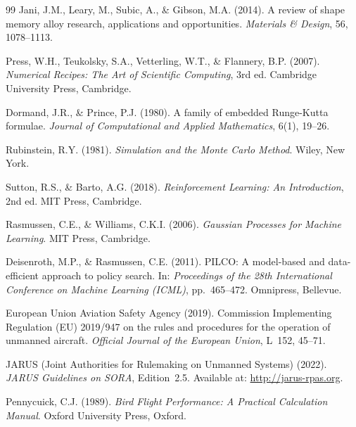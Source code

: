 ﻿\documentclass[12pt,a4paper]{article}
\theoremstyle{remark}
\begin{document}
\begin{thebibliography}{99}
		Jani, J.M., Leary, M., Subic, A., \& Gibson, M.A. (2014). A review of shape memory alloy research, applications and opportunities. \textit{Materials \& Design}, 56, 1078--1113.


		Press, W.H., Teukolsky, S.A., Vetterling, W.T., \& Flannery, B.P. (2007). \textit{Numerical Recipes: The Art of Scientific Computing}, 3rd ed. Cambridge University Press, Cambridge.

		Dormand, J.R., \& Prince, P.J. (1980). A family of embedded Runge-Kutta formulae. \textit{Journal of Computational and Applied Mathematics}, 6(1), 19--26.

		Rubinstein, R.Y. (1981). \textit{Simulation and the Monte Carlo Method}. Wiley, New York.


		Sutton, R.S., \& Barto, A.G. (2018). \textit{Reinforcement Learning: An Introduction}, 2nd ed. MIT Press, Cambridge.

		Rasmussen, C.E., \& Williams, C.K.I. (2006). \textit{Gaussian Processes for Machine Learning}. MIT Press, Cambridge.

		Deisenroth, M.P., \& Rasmussen, C.E. (2011). PILCO: A model-based and data-efficient approach to policy search. In: \textit{Proceedings of the 28th International Conference on Machine Learning (ICML)}, pp.~465--472. Omnipress, Bellevue.


		European Union Aviation Safety Agency (2019). Commission Implementing Regulation (EU) 2019/947 on the rules and procedures for the operation of unmanned aircraft. \textit{Official Journal of the European Union}, L~152, 45--71.

		JARUS (Joint Authorities for Rulemaking on Unmanned Systems) (2022). \textit{JARUS Guidelines on SORA}, Edition~2.5. Available at: \url{http://jarus-rpas.org}.


		Pennycuick, C.J. (1989). \textit{Bird Flight Performance: A Practical Calculation Manual}. Oxford University Press, Oxford.


\end{thebibliography}
\end{document}
